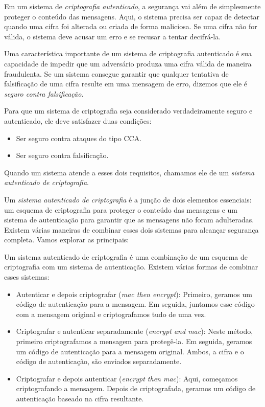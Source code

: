 Em um sistema de {\em criptografia autenticado}, a segurança vai além de simplesmente proteger o conteúdo das mensagens.
Aqui, o sistema precisa ser capaz de detectar quando uma cifra foi alterada ou criada de forma maliciosa.
Se uma cifra não for válida, o sistema deve acusar um erro e se recusar a tentar decifrá-la.

Uma característica importante de um sistema de criptografia autenticado é sua capacidade de impedir que um adversário produza uma cifra válida de maneira fraudulenta.
Se um sistema consegue garantir que qualquer tentativa de falsificação de uma cifra resulte em uma mensagem de erro, dizemos que ele é {\em seguro contra falsificação}.

Para que um sistema de criptografia seja considerado verdadeiramente seguro e autenticado, ele deve satisfazer duas condições:
\begin{itemize}
\item Ser seguro contra ataques do tipo CCA.
\item Ser seguro contra falsificação.
\end{itemize}

Quando um sistema atende a esses dois requisitos, chamamos ele de um {\em sistema autenticado de criptografia}.

Um {\em sistema autenticado de criptografia} é a junção de dois elementos essenciais:
um esquema de criptografia para proteger o conteúdo das mensagens e um sistema de autenticação para garantir que as mensagens não foram adulteradas.
Existem várias maneiras de combinar esses dois sistemas para alcançar segurança completa. Vamos explorar as principais:

Um sistema autenticado de criptografia é uma combinação de um esquema de criptografia com um sistema de autenticação.
Existem várias formas de combinar esses sistemas:
\begin{itemize}
\item Autenticar e depois criptografar ({\em mac then encrypt}):
  Primeiro, geramos um código de autenticação para a mensagem.
  Em seguida, juntamos esse código com a mensagem original e criptografamos tudo de uma vez. 
\item Criptografar e autenticar separadamente ({\em encrypt and mac}):
  Neste método, primeiro criptografamos a mensagem para protegê-la.
  Em seguida, geramos um código de autenticação para a mensagem original.
  Ambos, a cifra e o código de autenticação, são enviados separadamente.
\item Criptografar e depois autenticar ({\em encrypt then mac}):
  Aqui, começamos criptografando a mensagem.
  Depois de criptografada, geramos um código de autenticação baseado na cifra resultante. 
\end{itemize}

